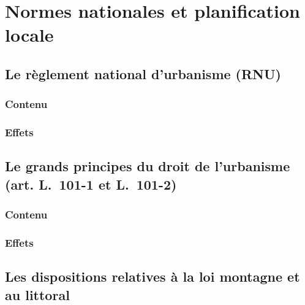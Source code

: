 
\chapter{Normes nationales et planification locale}


\section{Le règlement national d'urbanisme (RNU)}
	
	\subsection{Contenu}
	
	\subsection{Effets}

\section{Le grands principes du droit de l'urbanisme (art. L.~101-1 et L.~101-2)}
	
	\subsection{Contenu}
	
	\subsection{Effets}

\section{Les dispositions relatives à la loi montagne et au littoral}

